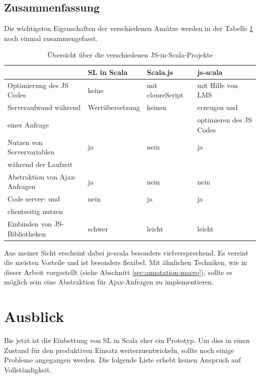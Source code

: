 \documentclass[12pt,bibtotoc]{scrreprt}
\begin{document}
\section{Zusammenfassung}

Die wichtigsten Eigenschaften der verschiedenen Ansätze werden in der Tabelle \ref{tab:related-work-overview} noch einmal zusammengefasst.

\begin{table}[ht]
\caption{Übersicht über die verschiedenen JS-in-Scala-Projekte}
\centering
\begin{tabular}{llll}
      & SL in Scala &  Scala.js              &    js-scala \\
\midrule
Optimierung des JS Codes  &  keine  &  mit cloureScript & mit Hilfe von LMS\\
\addlinespace
Serveraufwand während & Wertübersetzung & keinen & erzeugen und  \\
einer Anfrage &  & & optimieren des JS Codes\\
\addlinespace
Nutzen von Servervariablen  & ja & nein & ja \\
während der Laufzeit & \\
\addlinespace
Abstraktion von Ajax-Anfragen & ja & nein & nein \\
\addlinespace
Code server- und & nein & ja & ja \\
clientseitig nutzen \\
\addlinespace
Einbinden von JS-Bibliotheken & schwer & leicht & leicht \\

\end{tabular}
\label{tab:related-work-overview}
\end{table}

Aus meiner Sicht erscheint dabei js-scala besonders vielversprechend. Es vereint die meisten Vorteile und ist besonders flexibel. Mit ähnlichen Techniken, wie in dieser Arbeit vorgestellt (siehe Abschnitt \ref{sec:annotation-macro}), sollte es möglich sein eine Abstraktion für Ajax-Anfragen zu implementieren.

\chapter{Ausblick}
\label{sec:future-works}

Bis jetzt ist die Einbettung von SL in Scala eher ein Prototyp. Um dies in einen Zustand für den produktiven Einsatz weiterzuentwickeln, sollte noch einige Probleme angegangen werden. Die folgende Liste erhebt keinen Anspruch auf Vollständigkeit. 
\end{document}
